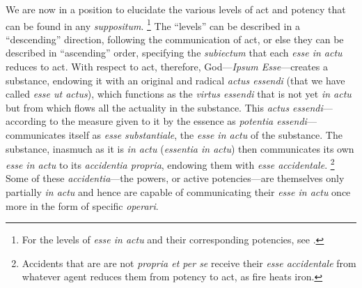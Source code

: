 We are now in a position to elucidate the various levels of act and potency that can be found in any \emph{suppositum}.%
%
\footnote{For the levels of \emph{esse in actu} and their corresponding potencies, see \cite[57--59]{contat:esse-essentia-ordo}.} The ``levels'' can be described in a ``descending'' direction, following the communication of act, or else they can be described in ``ascending'' order, specifying the \emph{subiectum} that each \emph{esse in actu} reduces to act. With respect to act, therefore, God---\emph{Ipsum Esse}---creates a substance, endowing it with an original and radical \emph{actus essendi} (that we have called \emph{esse ut actus}), which functions as the \emph{virtus essendi} that is not yet \emph{in actu} but from which flows all the actuality in the substance. This \emph{actus essendi}---according to the measure given to it by the essence as \emph{potentia essendi}---communicates itself as \emph{esse substantiale}, the \emph{esse in actu} of the substance. The substance, inasmuch as it is \emph{in actu} (\emph{essentia in actu}) then communicates its own \emph{esse in actu} to its \emph{accidentia propria}, endowing them with \emph{esse accidentale}.%
%
\footnote{Accidents that are are not \emph{propria et per se} receive their \emph{esse accidentale} from whatever agent reduces them from potency to act, as fire heats iron.} Some of these \emph{accidentia}---the powers, or active potencies---are themselves only partially \emph{in actu} and hence are capable of communicating their \emph{esse in actu} once more in the form of specific \emph{operari}.

